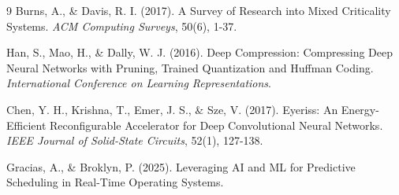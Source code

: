 \documentclass[11pt,a4paper]{article}
\begin{document}
\begin{thebibliography}{9}
Burns, A., \& Davis, R. I. (2017).
A Survey of Research into Mixed Criticality Systems.
\textit{ACM Computing Surveys}, 50(6), 1-37.

Han, S., Mao, H., \& Dally, W. J. (2016).
Deep Compression: Compressing Deep Neural Networks with Pruning, Trained Quantization and Huffman Coding.
\textit{International Conference on Learning Representations}.

Chen, Y. H., Krishna, T., Emer, J. S., \& Sze, V. (2017).
Eyeriss: An Energy-Efficient Reconfigurable Accelerator for Deep Convolutional Neural Networks.
\textit{IEEE Journal of Solid-State Circuits}, 52(1), 127-138.


Gracias, A., \& Broklyn, P. (2025).
Leveraging AI and ML for Predictive Scheduling in Real-Time Operating Systems.

\end{thebibliography}
\end{document}
